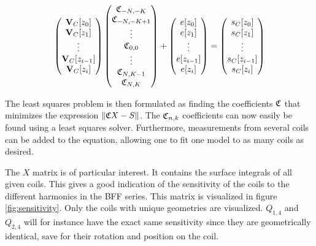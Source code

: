 \begin{equation}
    \begin{pmatrix}
        \vb{V}_C[z_0]     \\ \vb{V}_C[z_{1}] \\ \vdots \\
        \vb{V}_C[z_{i-1}] \\ \vb{V}_C[z_i]
    \end{pmatrix}
    \begin{pmatrix}
        \Cnk[-N, -K] \\ \Cnk[-N, -K+1]\\ \vdots\\
        \Cnk[0, 0]   \\ \vdots \\ \Cnk[N, K-1]\\ \Cnk[N, K]
    \end{pmatrix}
    + \begin{pmatrix}
        e[z_0]     \\ e[z_1]\\ \vdots\\
        e[z_{i-1}] \\ e[z_i]
    \end{pmatrix} =
    \begin{pmatrix}
        s_C[z_0] \\ s_C[z_1] \\ \vdots \\ s_C[z_{i-1}] \\
        s_C[z_i]
    \end{pmatrix}
    \label{eq:matrixmodel}
\end{equation}

The least squares problem is then formulated as finding the
coefficients $\frak{C}$ that minimizes the expression
$\| \frak{C}X - S \|$.
The $\mathfrak{C}_{n,k}$ coefficients can now easily be found using a
least squares solver. Furthermore, measurements from
several coils can be added to the equation, allowing one
to fit one model to as many coils as desired.

The $X$ matrix is of particular interest. It contains the
surface integrals of all given coils. This gives a good
indication of the sensitivity of the coils to the different
harmonics in the BFF series. This matrix is visualized in
figure \ref{fig:sensitivity}. Only the coils with unique
geometries are visualized. $Q_{1,4}$ and $Q_{2,4}$ will
for instance have the exact same sensitivity since they
are geometrically identical, save for their rotation and
position on the coil.

